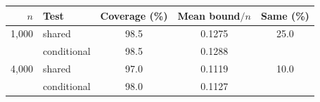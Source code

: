 \begin{tabular}{rlccc}
\toprule
$n$ & Test & Coverage (\%) & Mean bound$/n$ & Same (\%) \\
\midrule
1,000 & shared & 98.5 & 0.1275 & 25.0 \\
 & conditional & 98.5 & 0.1288 &  \\
4,000 & shared & 97.0 & 0.1119 & 10.0 \\
 & conditional & 98.0 & 0.1127 &  \\
\bottomrule
\end{tabular}
